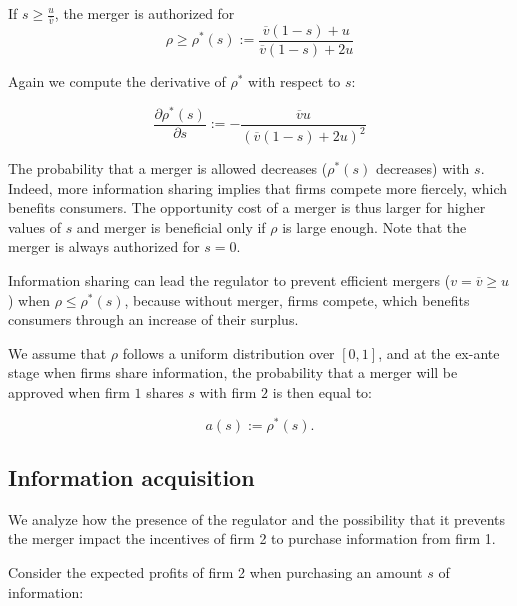 \documentclass[a4paper,leqno]{article}%
\newcommand{\ov}{\overline{v}}
\begin{document}
If $s\geq \frac{u}{\ov}$, the merger is authorized for 
    \begin{equation}
           \rho\geq \rho^*(s):=\frac{\ov(1-s)+u}{\ov(1-s)+2u}
    \end{equation}

Again we compute the derivative of $\rho^*$ with respect to $s$:

\[
    \frac{\partial \rho^{*}(s)}{\partial s}:=-\frac{\ov u}{(\ov(1-s)+2u)^2}
\]

The probability that a merger is allowed decreases ($\rho^*(s)$ decreases) with $s$. Indeed, more information sharing implies that firms compete more fiercely, which benefits consumers. The opportunity cost of a merger is thus larger for higher values of $s$ and merger is beneficial only if $\rho$ is large enough. Note that the merger is always authorized for $s=0$.

\medskip

Information sharing can lead the regulator to prevent efficient mergers ($v=\ov \geq u$) when $\rho \leq \rho^*(s)$, because without merger, firms compete, which benefits consumers through an increase of their surplus. 

\medskip

We assume that $\rho$ follows a uniform distribution over $[0,1]$, and at the ex-ante stage when firms share information, the probability that a merger will be approved when firm $1$ shares $s$ with firm $2$ is then equal to:

\[
a(s):=\rho^*(s).
\]

\subsection{Information acquisition}

We analyze how the presence of the regulator and the possibility that it prevents the merger impact the incentives of firm 2 to purchase information from firm 1.

Consider the expected profits of firm 2 when purchasing an amount $s$ of information:
\end{document}
